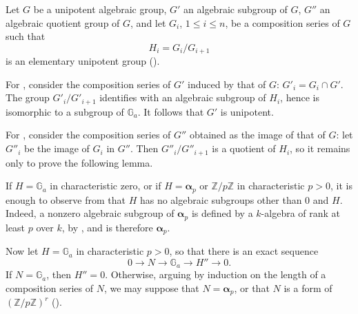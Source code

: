 Let \(G\) be a unipotent algebraic group, \(G'\) an algebraic subgroup of
\(G\), \(G''\) an algebraic quotient group of \(G\), and let
\(G_i\), \(1\leq i\leq n\), be a composition series of \(G\) such that
\[
  H_i=G_i/G_{i+1}
\]
is an elementary unipotent group ().

For , consider the composition series of \(G'\) induced by that of \(G\):
\(G'_i=G_i\cap G'\).  The group \(G'_i/G'_{i+1}\) identifies with an
algebraic subgroup of \(H_i\), hence is isomorphic to a subgroup of
\(\mathbb G_a\).  It follows that \(G'\) is unipotent.

For , consider the composition series of \(G''\) obtained as the image
of that of \(G\): let \(G''_i\) be the image of \(G_i\) in \(G''\).  Then
\(G''_i/G''_{i+1}\) is a quotient of \(H_i\), so it remains only to prove the
following lemma.


If \(H=\mathbb G_a\) in characteristic zero, or if
\(H=\boldsymbol\alpha_p\) or \(\mathbb Z/p\mathbb Z\) in characteristic
\(p>0\), it is enough to observe from  that \(H\) has no
algebraic subgroups other than \(0\) and \(H\).  Indeed, a nonzero algebraic
subgroup of \(\boldsymbol\alpha_p\) is defined by a \(k\)-algebra of rank at
least \(p\) over \(k\), by , and is therefore
\(\boldsymbol\alpha_p\).

Now let \(H=\mathbb G_a\) in characteristic \(p>0\), so that there is an exact
sequence
\[
  0\longrightarrow N\longrightarrow\mathbb G_a
    \longrightarrow H''\longrightarrow0.
\]
If \(N=\mathbb G_a\), then \(H''=0\).  Otherwise, arguing by induction on the
length of a composition series of \(N\), we may suppose that
\(N=\boldsymbol\alpha_p\), or that \(N\) is a form of
\((\mathbb Z/p\mathbb Z)^r\) ().

